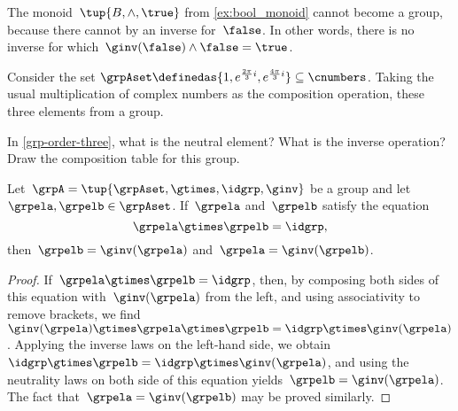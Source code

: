 \begin{example}
  The monoid~$\tup{B,\wedge, \true}$ from \cref{ex:bool_monoid} cannot become a group, because there cannot by an inverse for~$\false$. In other words, there is no inverse for which~$\ginv(\false)\wedge \false=\true$.
\end{example}
\begin{example}
  \label{grp-order-three}
  Consider the set $\grpAset \definedas \{ 1, e^{\frac{2\pi}{3} i}, e^{\frac{4\pi }{3}i}  \} \subseteq \cnumbers$.
  Taking the usual multiplication of complex numbers as the composition operation, these three elements from a group.
\end{example}

\begin{gradedexercise}\label{ex:GroupWithThreeElements}
  In \cref{grp-order-three}, what is the neutral element? What is the inverse operation?
  Draw the composition table for this group.
\end{gradedexercise}


\begin{lemma}
 \label{lem:inv-op-unique}
Let~$\grpA = \tup{ \grpAset, \gtimes, \idgrp, \ginv }$ be a group and let~$\grpela, \grpelb \in \grpAset$. If~$\grpela$ and~$\grpelb$ satisfy the equation
\begin{equation}
\grpela \gtimes \grpelb = \idgrp,
\end{equation}
then~$\grpelb = \ginv( \grpela )$ and~$\grpela = \ginv(\grpelb)$.
\end{lemma}

\begin{proof}
If~$\grpela \gtimes \grpelb = \idgrp$, then, by composing both sides of this equation with~$\ginv(\grpela)$ from the left, and using associativity to remove brackets, we find~$\ginv(\grpela) \gtimes \grpela \gtimes \grpelb = \idgrp \gtimes \ginv(\grpela)$.
Applying the inverse laws on the left-hand side, we obtain~$\idgrp \gtimes \grpelb = \idgrp \gtimes \ginv(\grpela)$, and using the neutrality laws on both side of this equation yields~$\grpelb =  \ginv(\grpela)$.
The fact that~$\grpela = \ginv(\grpelb)$ may be proved similarly.
\end{proof}


